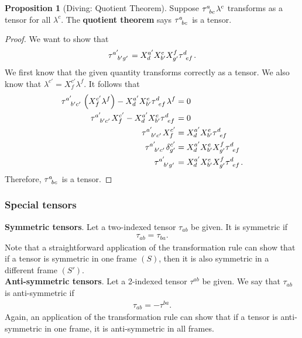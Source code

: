 \documentclass{article}
\theoremstyle{definition}
\newtheorem{prop}{Proposition}[section]
\begin{document}
\begin{prop}[Diving: Quotient Theorem]
	Suppose $\tensor{\tau}{^{a}_{bc}}\lambda^c$ transforms as a tensor for all $\lambda^c$. The \textbf{quotient theorem} says $\tensor{\tau}{^{a}_{bc}}$ is a tensor.  
\end{prop} 
\begin{proof}
	We want to show that 
	\begin{align*}
	\tensor{\tau}{^{a'}_{b'g'}} = X^{a'}_dX^{e}_{b'}X^{f}_{g'} \tensor{\tau}{^d_{ef}}.
	\end{align*}
	We first know that the given quantity transforms correctly as a tensor. We also know that $\lambda^{c'} = X^{c'}_f\lambda^f$. It follows that
	\begin{align*}
	\tensor{\tau}{^{a'}_{b'c'}}\left( X^{c'}_f\lambda^f \right) - X^{a'}_dX^{e}_{b'}\tensor{\tau}{^d_{ef}}\lambda^f &= 0\\
	\tensor{\tau}{^{a'}_{b'c'}}X^{c'}_f - X^{a'}_dX^{e}_{b'}\tensor{\tau}{^d_{ef}} &= 0\\
	\tensor{\tau}{^{a'}_{b'c'}}X^{c'}_f &= X^{a'}_dX^{e}_{b'}\tensor{\tau}{^d_{ef}}\\
	\tensor{\tau}{^{a'}_{b'c'}}\delta^{c'}_{g'} &= X^{a'}_dX^{e}_{b'}X^{f}_{g'}\tensor{\tau}{^d_{ef}}\\
	\tensor{\tau}{^{a'}_{b'g'}}&=X^{a'}_dX^{e}_{b'}X^{f}_{g'}\tensor{\tau}{^d_{ef}}.
	\end{align*}
	Therefore, $\tensor{\tau}{^{a}_{bc}}$ is a tensor. 
\end{proof}

\subsubsection{Special tensors}
\textbf{Symmetric tensors}. Let a two-indexed tensor $\tau_{ab}$ be given. It is symmetric if
\begin{align*}
\tau_{ab} = \tau_{ba}.
\end{align*}
Note that a straightforward application of the transformation rule can show that if a tensor is symmetric in one frame $(S)$, then it is also symmetric in a different frame $(S')$.\\

\noindent \textbf{Anti-symmetric tensors}. Let a 2-indexed tensor $\tau^{ab}$ be given. We say that $\tau_{ab}$ is anti-symmetric if
\begin{align*}
\tau_{ab} = -\tau^{ba}.
\end{align*}
Again, an application of the transformation rule can show that if a tensor is anti-symmetric in one frame, it is anti-symmetric in all frames. \\
\end{document}
